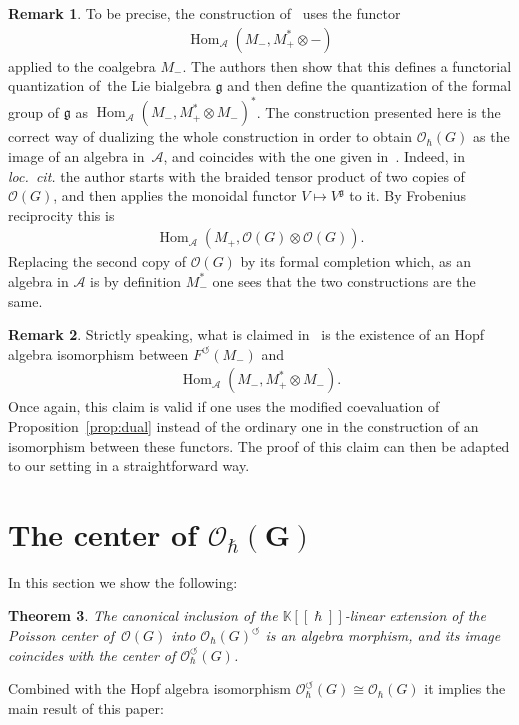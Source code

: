 \documentclass[10pt,a4paper]{amsart}
\numberwithin{equation}{section}
\newcommand{\ca}{\circlearrowleft}
\newcommand{\mf}[1]{\mathfrak{#1}}
\newcommand{\h}{\hslash}
\newcommand{\ot}{\otimes}
\newcommand{\cO}{\mathcal O}
\newcommand{\cA}{\mathcal {A}}
\newcommand{\kk}{\mathbb K}
\renewcommand{\hom}{\operatorname{Hom}}
\newtheorem{thm}{Theorem}[section]
\theoremstyle{definition}
\newtheorem{rmk}[thm]{Remark}
\begin{document}
\begin{rmk}\label{rmk:EK}
	To be precise, the construction of~\cite{Etingof1996} uses the functor
\begin{gather*}
		\hom_\cA(M_-,M_+^*\ot -)
	\end{gather*} applied to the coalgebra $M_-$. The authors then show that this def\/ines a functorial quantization of~the Lie bialgebra $\mf g$ and then def\/ine the quantization of the formal group of $\mf g$ as $\hom_\cA(M_-,M_+^*\ot M_-)^*$. The construction presented here is the correct way of dualizing the whole construction in order to obtain $\cO_\h(G)$ as the image of an algebra in~$\cA$, and coincides with the one given in~\cite{Severa2016}. Indeed, in \emph{loc.\ cit.} the author starts with the braided tensor product of two copies of~$\cO(G)$, and then applies the monoidal functor $V\mapsto V^{\mf g}$ to it. By Frobenius reciprocity this is
	\begin{gather*}
		\hom_\cA(M_+,\cO(G)\ot \cO(G)).
	\end{gather*}
	Replacing the second copy of $\cO(G)$ by its formal completion which, as an algebra in $\cA$ is by def\/inition $M_-^*$ one sees that the two constructions are the same.
\end{rmk}
\begin{rmk}
	Strictly speaking, what is claimed in~\cite{Etingof1996} is the existence of an Hopf algebra isomorphism between $F^\ca(M_-)$ and
	\begin{gather*}
		\hom_\cA(M_-,M_+^*\ot M_-).
	\end{gather*}
	Once again, this claim is valid if one uses the modif\/ied coevaluation of Proposition~\ref{prop:dual} instead of the ordinary one in the construction of an isomorphism between these functors. The proof of this claim can then be adapted to our setting in a straightforward way.
\end{rmk}

\section[The center of $\cO_\h(G)$]{The center of $\boldsymbol{\cO_\h(G)}$}
In this section we show the following:
\begin{thm}\label{thm:Poisson}
	The canonical inclusion of the $\kk[[\h]]$-linear extension of the Poisson center of~$\cO(G)$ into $\cO_\h(G)^\ca$ is an algebra morphism, and its image coincides with the center of $\cO_\h^\ca(G)$.
\end{thm}
Combined with the Hopf algebra isomorphism $\cO_\h^\ca(G)\cong \cO_\h(G)$ it implies the main result of this paper:
\end{document}
